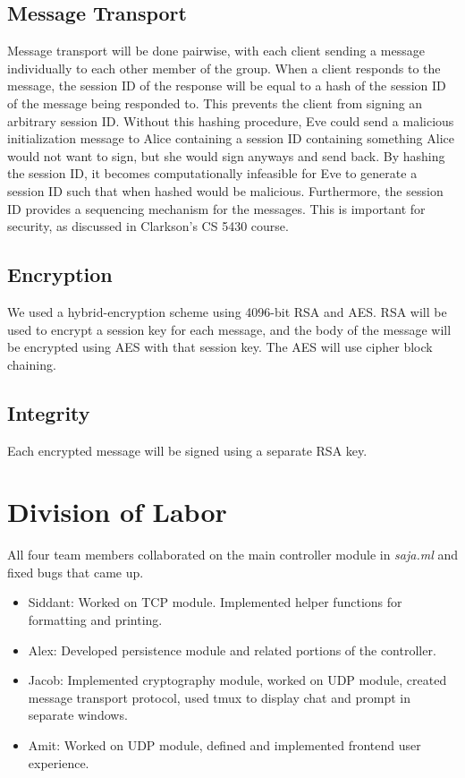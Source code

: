 \documentclass{scrartcl}
\begin{document}
\subsection{Message Transport}
Message transport will be done pairwise, with each client sending a message individually to each other member of the group. When a client responds to the message, the session ID of the response will be equal to a hash of the session ID of the message being responded to. This prevents the client from signing an arbitrary session ID. Without this hashing procedure, Eve could send a malicious initialization message to Alice containing a session ID containing something Alice would not want to sign, but she would sign anyways and send back. By hashing the session ID, it becomes computationally infeasible for Eve to generate a session ID such that when hashed would be malicious. Furthermore, the session ID provides a sequencing mechanism for the messages. This is important for security, as discussed in Clarkson's CS 5430 course.

\subsection{Encryption}
We used a hybrid-encryption scheme using 4096-bit RSA and AES. RSA will be used to encrypt a session key for each message, and the body of the message will be encrypted using AES with that session key. The AES will use cipher block chaining.\\

\subsection{Integrity}
Each encrypted message will be signed using a separate RSA key.

\section{Division of Labor}

All four team members collaborated on the main controller module in \textit{saja.ml} and fixed bugs that came up.


\begin{itemize}

        \item Siddant: Worked on TCP module. Implemented helper functions for formatting and printing.\\

        \item Alex: Developed persistence module and related portions of the controller.\\

        \item Jacob: Implemented cryptography module, worked on UDP module, created message transport protocol, used tmux to display chat and prompt in separate windows. \\

        \item Amit: Worked on UDP module, defined and implemented frontend user experience. \\

\end{itemize}
\end{document}
